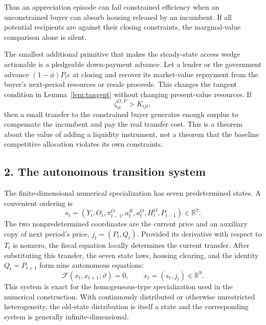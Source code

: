 \documentclass[11pt]{article}
\begin{document}
Thus an appreciation episode can fail constrained efficiency when an
unconstrained buyer can absorb housing released by an incumbent.  If all
potential recipients are against their closing constraints, the
marginal-value comparison alone is silent.

The smallest additional primitive that makes the steady-state access wedge
actionable is a pledgeable down-payment advance.  Let a lender or the government
advance $(1-\phi)P_t\epsilon$ at closing and recover its market-value repayment
from the buyer's next-period resources or resale proceeds.  This changes the
tangent condition in Lemma~\ref{lem:tangent} without changing present-value
resources.  If
\begin{equation}
 \zeta_{it}^{O,F}>K_{ijt},
 \label{eq:credit_test}
\end{equation}
then a small transfer to the constrained buyer generates enough surplus to
compensate the incumbent and pay the real transfer cost.  This is a theorem
about the value of adding a liquidity instrument, not a theorem that the
baseline competitive allocation violates its own constraints.

\subsection*{2. The autonomous transition system}

The finite-dimensional numerical specialization has seven predetermined
states.  A convenient ordering is
\begin{equation}
 s_t=(Y_t,O_t,\pi_{t-1}^{O},a_t^{R},a_t^{O},H_t^{O},P_{t-1})\in\mathbb R^7.
 \label{eq:states}
\end{equation}
The two nonpredetermined coordinates are the current price and an auxiliary
copy of next period's price, $j_t=(P_t,Q_t)$.  Provided its derivative with
respect to $T_t$ is nonzero, the fiscal equation locally determines the current
transfer.  After substituting this transfer, the seven
state laws, housing clearing, and the identity $Q_t=P_{t+1}$ form nine
autonomous equations:
\begin{equation}
 \mathcal F(x_t,x_{t+1};\vartheta)=0,
 \qquad x_t=(s_t,j_t)\in\mathbb R^9.
 \label{eq:autonomous_system}
\end{equation}
This system is exact for the homogeneous-type specialization used in the
numerical construction.  With continuously distributed or otherwise
unrestricted heterogeneity, the old-state distribution is itself a state and
the corresponding system is generally infinite-dimensional.
\end{document}
